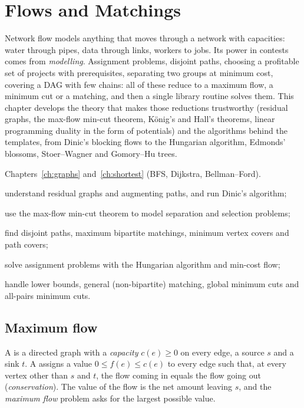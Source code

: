 \chapter{Flows and Matchings}\label{ch:flows}

Network flow models anything that moves through a network with capacities: water through pipes, data through links,
workers to jobs. Its power in contests comes from \emph{modelling}. Assignment problems, disjoint paths, choosing a profitable
set of projects with prerequisites, separating two groups at minimum cost, covering a DAG with few chains: all of these reduce
to a maximum flow, a minimum cut or a matching, and then a single library routine solves them. This chapter develops the
theory that makes those reductions trustworthy (residual graphs, the max-flow min-cut theorem, König's and Hall's theorems,
linear programming duality in the form of potentials) and the algorithms behind the templates, from Dinic's blocking flows to
the Hungarian algorithm, Edmonds' blossoms, Stoer--Wagner and Gomory--Hu trees.

\begin{chapterintro}{\ioi}{Chapters~\ref{ch:graphs} and~\ref{ch:shortest} (BFS, Dijkstra, Bellman--Ford).}
  \item understand residual graphs and augmenting paths, and run Dinic's algorithm;
  \item use the max-flow min-cut theorem to model separation and selection problems;
  \item find disjoint paths, maximum bipartite matchings, minimum vertex covers and path covers;
  \item solve assignment problems with the Hungarian algorithm and min-cost flow;
  \item handle lower bounds, general (non-bipartite) matching, global minimum cuts and all-pairs minimum cuts.
\end{chapterintro}

\section[Maximum flow]{Maximum flow \hfill \ioi}\label{sec:maxflow}

A  is a directed graph with a \emph{capacity} $c(e) \ge 0$ on every edge, a source $s$ and a sink $t$. A
 assigns a value $0 \le f(e) \le c(e)$ to every edge such that, at every vertex other than $s$ and $t$, the flow
coming in equals the flow going out (\emph{conservation}). The value of the flow is the net amount leaving $s$, and the
\emph{maximum flow} problem asks for the largest possible value.

